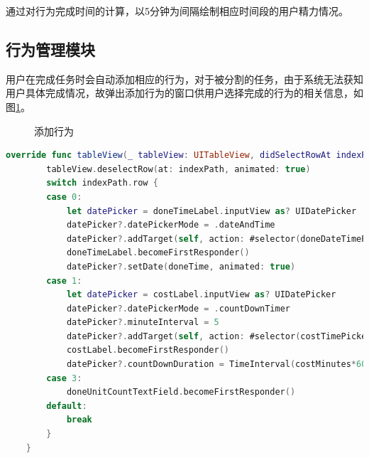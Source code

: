 

通过对行为完成时间的计算，以5分钟为间隔绘制相应时间段的用户精力情况。

\subsection{行为管理模块}

用户在完成任务时会自动添加相应的行为，对于被分割的任务，由于系统无法获知
用户具体完成情况，故弹出添加行为的窗口供用户选择完成的行为的相关信息，如图\ref{fig:add_action}。

\begin{figure}[!hbp]
	\centering
	\caption{添加行为}
	\label{fig:add_action}
\end{figure}

\begin{lstlisting}[language={Swift}, caption={添加行为的代码}]
	override func tableView(_ tableView: UITableView, didSelectRowAt indexPath: IndexPath) {
        tableView.deselectRow(at: indexPath, animated: true)
        switch indexPath.row {
        case 0:
            let datePicker = doneTimeLabel.inputView as? UIDatePicker
            datePicker?.datePickerMode = .dateAndTime
            datePicker?.addTarget(self, action: #selector(doneDateTimePickerValueChanged(sender:)), for: .valueChanged)
            doneTimeLabel.becomeFirstResponder()
            datePicker?.setDate(doneTime, animated: true)
        case 1:
            let datePicker = costLabel.inputView as? UIDatePicker
            datePicker?.datePickerMode = .countDownTimer
            datePicker?.minuteInterval = 5
            datePicker?.addTarget(self, action: #selector(costTimePickerValueChanged(sender:)), for: .valueChanged)
            costLabel.becomeFirstResponder()
            datePicker?.countDownDuration = TimeInterval(costMinutes*60)
        case 3:
            doneUnitCountTextField.becomeFirstResponder()
        default:
            break
        }
    }
\end{lstlisting}

